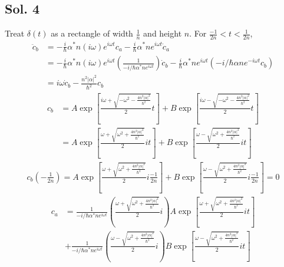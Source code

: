 \subsection*{Sol. 4}
Treat $\delta(t)$ as a rectangle of width $\frac{1}{n}$ and height $n$.
For $\frac{-1}{2n}<t < \frac{1}{2n}$,
\begin{align*}
    \ddot c_b & = -\frac{i}{\hbar}
    \alpha^* n (i\omega)e^{i\omega t} c_a
    -\frac{i}{\hbar}
    \alpha^* n e^{i\omega t}\dot c_a \\
              & =
    -\frac{i}{\hbar}
    \alpha^* n (i\omega)e^{i\omega t}
    (\frac{1}{-i/\hbar \alpha^* ne^{i\omega t}})\dot c_b
    -\frac{i}{\hbar}
    \alpha^* n e^{i\omega t}
    (-i/\hbar \alpha n e^{-i\omega t}c_b) \\
              & = i\omega \dot c_b - \frac{n^2|\alpha|^2}{\hbar^2}c_b
\end{align*}
\begin{align*}
    c_b & = A\exp\left[
                     \frac{i\omega + \sqrt{-\omega^2 - \frac{4n^2|\alpha|^2}{\hbar^2}}}{2} t
                     \right] +
    B\exp\left[
             \frac{i\omega - \sqrt{-\omega^2 - \frac{4n^2|\alpha|^2}{\hbar^2}}}{2}t
             \right] \\
        & =
    A\exp\left[
             \frac{\omega + \sqrt{\omega^2 + \frac{4n^2|\alpha|^2}{\hbar^2}}}{2} it
             \right] +
    B\exp\left[
             \frac{\omega -\sqrt{\omega^2 + \frac{4n^2|\alpha|^2}{\hbar^2}}}{2}it
             \right]
\end{align*}
\begin{align*}
    c_b(-\frac{1}{2n}) = A\exp\left[
                                  \frac{\omega + \sqrt{\omega^2 + \frac{4n^2|\alpha|^2}{\hbar^2}}}{2} i\frac{-1}{2n}
                                  \right] +
    B\exp\left[
             \frac{\omega -\sqrt{\omega^2 + \frac{4n^2|\alpha|^2}{\hbar^2}}}{2}i\frac{-1}{2n}
             \right]=0
\end{align*}
\begin{align*}
    c_a & =
    \frac{1}{-i/\hbar\alpha^* n e^{i\omega t}}\left(\frac{\omega + \sqrt{\omega^2 + \frac{4n^2|\alpha|^2}{\hbar^2}}}{2} i\right)A\exp\left[
                                                                                                                                         \frac{\omega + \sqrt{\omega^2 + \frac{4n^2|\alpha|^2}{\hbar^2}}}{2} it
                                                                                                                                         \right] \\
        & +
    \frac{1}{-i/\hbar\alpha^* n e^{i\omega t}}\left( \frac{\omega -\sqrt{\omega^2 + \frac{4n^2|\alpha|^2}{\hbar^2}}}{2}i\right) B\exp\left[
                                                                                                                                         \frac{\omega -\sqrt{\omega^2 + \frac{4n^2|\alpha|^2}{\hbar^2}}}{2}it
                                                                                                                                         \right]
\end{align*}

